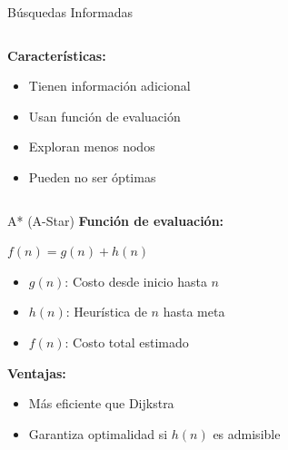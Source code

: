 \documentclass{beamer}
\begin{document}
\begin{frame}{Búsquedas Informadas}
    \begin{columns}
        \begin{column}{0.6\textwidth}
            \textbf{Características:}
            \begin{itemize}
                \item Tienen información adicional
                \item Usan función de evaluación
                \item Exploran menos nodos
                \item Pueden no ser óptimas
            \end{itemize}
        \end{column}
        \begin{column}{0.4\textwidth}
            \centering
            {\fontsize{60}{60}\selectfont \faBook}
        \end{column}
    \end{columns}
\end{frame}

\begin{frame}{A* (A-Star)}
    \textbf{Función de evaluación:}
    \begin{center}
        $f(n) = g(n) + h(n)$
    \end{center}
    
    \vspace{0.3cm}
    
    \begin{itemize}
        \item $g(n)$: Costo desde inicio hasta $n$
        \item $h(n)$: Heurística de $n$ hasta meta
        \item $f(n)$: Costo total estimado
    \end{itemize}
    
    \vspace{0.5cm}
    
    \textbf{Ventajas:}
    \begin{itemize}
        \item Más eficiente que Dijkstra
        \item Garantiza optimalidad si $h(n)$ es admisible
    \end{itemize}
\end{frame}
\end{document}
